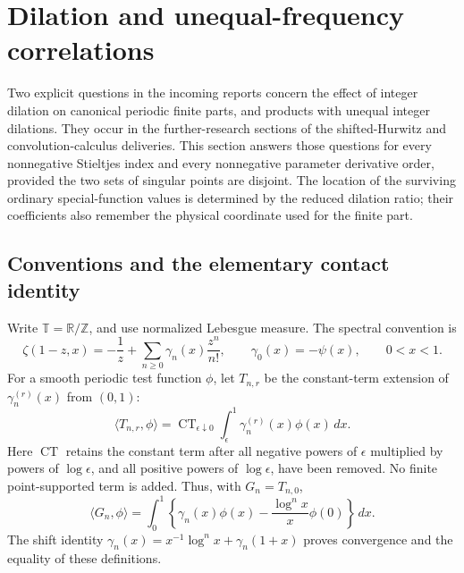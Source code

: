 \section{Dilation and unequal-frequency correlations}
\label{mld:dil:section}\label{mld:sec:dilation}

Two explicit questions in the incoming reports concern the effect of
integer dilation on canonical periodic finite parts, and products with
unequal integer dilations.  They occur in the further-research sections
of the shifted-Hurwitz and convolution-calculus deliveries.  This section
answers those questions for every nonnegative Stieltjes index and every
nonnegative parameter derivative order, provided the two sets of
singular points are disjoint.  The location of the surviving ordinary
special-function values is determined by the reduced dilation ratio;
their coefficients also remember the physical coordinate used for
the finite part.

\subsection{Conventions and the elementary contact identity}
Write $\mathbb T=\mathbb R/\mathbb Z$, and use normalized Lebesgue
measure.  The spectral convention is
\[
 \zeta(1-z,x)=-\frac1z+
       \sum_{n\ge0}\gamma_n(x)\frac{z^n}{n!},
 \qquad \gamma_0(x)=-\psi(x),
 \qquad 0<x<1.
\]
For a smooth periodic test function $\phi$, let $T_{n,r}$ be the
constant-term extension of $\gamma_n^{(r)}(x)$ from $(0,1)$:
\[
 \langle T_{n,r},\phi\rangle
 =\operatorname{CT}_{\epsilon\downarrow0}
      \int_\epsilon^1\gamma_n^{(r)}(x)\phi(x)\,dx.
\]
Here $\operatorname{CT}$ retains the constant term after all negative
powers of $\epsilon$ multiplied by powers of $\log\epsilon$, and all
positive powers of $\log\epsilon$, have been removed.  No finite
point-supported term is added.  Thus, with $G_n=T_{n,0}$,
\[
 \langle G_n,\phi\rangle
 =\int_0^1\left\{\gamma_n(x)\phi(x)
                  -\frac{\log^n x}{x}\phi(0)\right\}\,dx.
\]
The shift identity $\gamma_n(x)=x^{-1}\log^n x+\gamma_n(1+x)$
proves convergence and the equality of these definitions.

